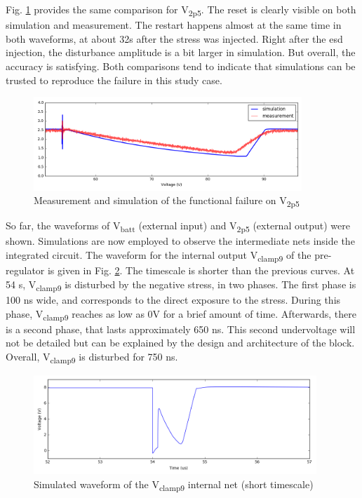Fig. \ref{fig:wvf-v2p5} provides the same comparison for V\textsubscript{2p5}.
The reset is clearly visible on both simulation and measurement.
The restart happens almost at the same time in both waveforms, at about 32\textmu{}s after the stress was injected.
Right after the \gls{esd} injection, the disturbance amplitude is a bit larger in simulation.
But overall, the accuracy is satisfying.
Both comparisons tend to indicate that simulations can be trusted to reproduce the failure in this study case.

\begin{figure}[!h]
  \centering
  \includegraphics[width=0.9\textwidth]{src/3/figures/v2p5.png}
  \caption{Measurement and simulation of the functional failure on V\textsubscript{2p5}}
  \label{fig:wvf-v2p5}
\end{figure}

So far, the waveforms of V\textsubscript{batt} (external input) and V\textsubscript{2p5} (external output) were shown.
Simulations are now employed to observe the intermediate nets inside the integrated circuit.
The waveform for the internal output V\textsubscript{clamp9} of the pre-regulator is given in Fig. \ref{fig:wvf-vclamp9}.
The timescale is shorter than the previous curves.
At 54 \textmugreek{}s,  V\textsubscript{clamp9} is disturbed by the negative stress, in two phases.
The first phase is 100 ns wide, and corresponds to the direct exposure to the stress.
During this phase, V\textsubscript{clamp9} reaches as low as 0V for a brief amount of time.
Afterwards, there is a second phase, that lasts approximately 650 ns.
This second undervoltage will not be detailed but can be explained by the design and architecture of the block.
Overall, V\textsubscript{clamp9} is disturbed for 750 ns.

\begin{figure}[!h]
  \centering
  \includegraphics[width=0.95\textwidth]{src/3/figures/vclamp9.png}
  \caption{Simulated waveform of the V\textsubscript{clamp9} internal net (short timescale)}
  \label{fig:wvf-vclamp9}
\end{figure}

